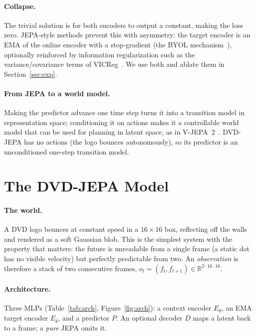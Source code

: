 \documentclass[11pt]{article}
\begin{document}
\paragraph{Collapse.} The trivial solution is for both encoders to output a constant, making the loss
zero. JEPA-style methods prevent this with asymmetry: the target encoder is an EMA of the online encoder
with a stop-gradient (the BYOL mechanism~\cite{grill2020}), optionally reinforced by information
regularization such as the variance/covariance terms of VICReg~\cite{bardes2022}. We use both and
ablate them in Section~\ref{sec:exp}.

\paragraph{From JEPA to a world model.} Making the predictor advance one time step turns it into a
transition model in representation space; conditioning it on actions makes it a controllable world model
that can be used for planning in latent space, as in V-JEPA~2~\cite{vjepa2}. DVD-JEPA has no actions
(the logo bounces autonomously), so its predictor is an unconditioned one-step transition model.

\section{The DVD-JEPA Model}
\paragraph{The world.} A DVD logo bounces at constant speed in a $16\times16$ box, reflecting off the
walls and rendered as a soft Gaussian blob. This is the simplest system with the property that matters:
the future is unreadable from a single frame (a static dot has no visible velocity) but perfectly
predictable from two. An \emph{observation} is therefore a stack of two consecutive frames,
$o_t=(f_t,f_{t+1})\in\mathbb{R}^{2\cdot16\cdot16}$.

\paragraph{Architecture.} Three MLPs (Table~\ref{tab:arch}, Figure~\ref{fig:arch}): a context encoder
$E_\theta$, an EMA target encoder $E_{\bar\theta}$, and a predictor $P$. An optional decoder $D$ maps a
latent back to a frame; a \emph{pure} JEPA omits it.
\end{document}
